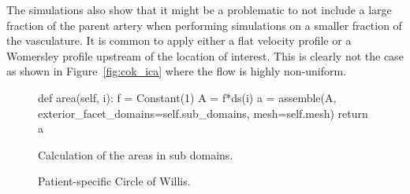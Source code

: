 The simulations also show that it might be a problematic to not
include a large fraction of the parent artery when performing
simulations on a smaller fraction of the vasculature. It is common to
apply either a flat velocity profile or a Womersley profile upstream
of the location of interest. This is clearly not the case as shown in
Figure~\ref{fig:cok_ica} where the flow is highly non-uniform.

\begin{figure}
  \begin{center}
    \begin{python}
def area(self, i):
    f = Constant(1)
    A = f*ds(i)
    a = assemble(A, exterior_facet_domains=self.sub_domains, mesh=self.mesh)
    return a
    \end{python}
    \caption{Calculation of the areas in sub domains.}
    \label{fig:area_code}
  \end{center}
\end{figure}

\begin{figure}
  \begin{center}
  \end{center}
  \caption{Patient-specific Circle of Willis.}
  \label{fig:screenshot}
\end{figure}


